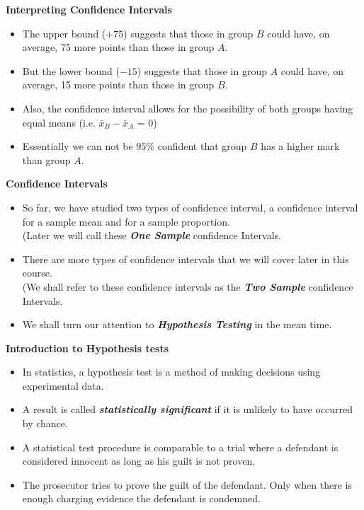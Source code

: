 \noindent \textbf{Interpreting Confidence Intervals}
\begin{itemize}
\item The upper bound ($+75$) suggests that those in group $B$ could have, on average, 75 more points than those in group $A$.
\item But the lower bound ($-15$) suggests  that those in group $A$ could have, on average, 15 more points than those in group $B$.
\item Also, the confidence interval allows for the possibility of both groups having equal means  (i.e. $\bar{x}_B-\bar{x}_A$ = 0)
\item Essentially we can not be $95\%$ confident that group $B$ has a higher mark than group $A$.
\end{itemize}



\noindent \textbf{Confidence Intervals}
\begin{itemize}
\item So far, we have studied two types of confidence interval, a confidence interval for a sample mean and for a sample proportion.\\ (Later we will call these \textbf{\textit{One Sample}} confidence Intervals.
\item There are more types of confidence intervals that we will cover later in this course. \\ (We shall refer to these confidence intervals as the \textbf{\textit{Two Sample}} confidence Intervals.
\item We shall turn our attention to \textit{\textbf{Hypothesis Testing}} in the mean time.
\end{itemize}



\noindent \textbf{Introduction to Hypothesis tests}
\large
\begin{itemize} \item
In statistics, a  hypothesis test is a method of making decisions using experimental data. \item A result is called \textbf{\emph{statistically significant}} if it is unlikely to have occurred by chance. \item A statistical test procedure is comparable to a trial where a defendant is considered innocent as long as his guilt is not proven.\item  The prosecutor tries to prove the guilt of the defendant. Only when there is enough charging evidence the defendant is condemned.
\end{itemize}




